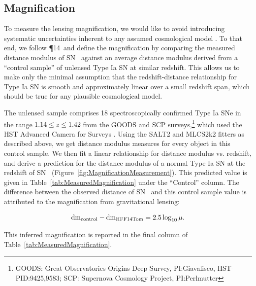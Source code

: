 \subsection{Magnification}
\label{sec:Magnification}

To measure the lensing magnification, we would like to avoid
introducing systematic uncertainties inherent to any assumed
cosmological model \citep[e.g.][]{Nordin:2014}.  To that end, we
follow \P14\ and define the magnification by comparing
the measured distance modulus of SN \tomas\ against an average
distance modulus derived from a ``control sample'' of unlensed Type Ia
SN at similar redshift.  This allows us to make only the minimal
assumption that the redshift-distance relationship for Type Ia SN is
smooth and approximately linear over a small redshift span, which
should be true for any plausible cosmological model.

The unlensed sample comprises 18 spectroscopically confirmed Type Ia
SNe in the range $1.14\leq z \leq1.42$ from the GOODS and SCP
surveys,\footnote{GOODS: Great Observatories Origins Deep Survey,
PI:Giavalisco, HST-PID:9425,9583; SCP: Supernova Cosmology Project,
PI:Perlmutter} which used the HST Advanced Camera for
Surveys \citep{Riess:2006,Suzuki:2012}.  Using the SALT2 and MLCS2k2
fitters as described above, we get distance modulus measures for every
object in this control sample.  We then fit a linear relationship for
distance modulus vs. redshift, and derive a prediction for the
distance modulus of a normal Type Ia SN at the redshift of SN \tomas\
(Figure~\ref{fig:MagnificationMeasurement}).
This predicted value is given in
Table~\ref{tab:MeasuredMagnification} under the ``Control'' column.
The difference between the observed distance of SN \tomas\ and this
control sample value is attributed to the magnification from
gravitational lensing:

\begin{equation} \label{eqn:mu}
{\rm dm}_{\rm control} - {\rm dm}_{\rm HFF14Tom} = 2.5 \log_{10}\mu.
\end{equation}

\noindent This inferred magnification is reported in the final column of
Table~\ref{tab:MeasuredMagnification}.

